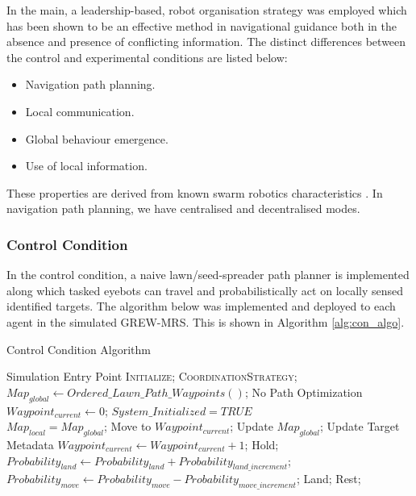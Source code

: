 \documentclass{report}
\begin{document}
In the main, a leadership-based, robot organisation strategy was employed which has been shown \cite{Dyer2008} to be an effective method in navigational guidance both in the absence and presence of conflicting information. The distinct differences between the control and experimental conditions are listed below:
\begin{itemize}
	\item Navigation path planning.
	\item Local communication.
	\item Global behaviour emergence.
	\item Use of local information.
\end{itemize}

These properties are derived from known swarm robotics characteristics \cite{Dorigo2013}. In navigation path planning, we have centralised and decentralised modes.

\subsubsection{Control Condition}
In the control condition, a naive lawn/seed-spreader path planner \cite{Galceran2013} is implemented along which tasked eyebots can travel and probabilistically act on locally sensed identified targets. The algorithm below was implemented and deployed to each agent in the simulated GREW-MRS. This is shown in Algorithm \ref{alg:con_algo}.

\begin{algorithm}[H]
	\caption{Control Condition Algorithm}
	\label{alg:con_algo}
	\begin{algorithmic}[1]
		 {} \Comment Simulation Entry Point
				\State \textsc{Initialize};
				\State \textsc{CoordinationStrategy};
			\EndWhile
		\EndProcedure
		\\
				\State $Map_{global} \gets Ordered\_Lawn\_Path\_Waypoints()$; \Comment No Path Optimization
				\State $Waypoint_{current} \gets 0$;
				\State $System\_Initialized = TRUE$
			\EndIf
		\EndProcedure
		\\
			\State $Map_{local} = Map_{global}$;
				\State Move to $Waypoint_{current}$;
						\State Update $Map_{global}$; \Comment Update Target Metadata
						\State $Waypoint_{current} \gets Waypoint_{current} + 1$;
					\Else
						\State Hold;
					\EndIf
					\State $Probability_{land} \gets Probability_{land} + Probability_{land\_increment}$;
					\State $Probability_{move} \gets Probability_{move} - Probability_{move\_increment}$;
				\EndIf
				\State Land;
			\Else
				\State Rest;
			\EndIf
		\EndProcedure
	\end{algorithmic}
\end{algorithm}
\end{document}
